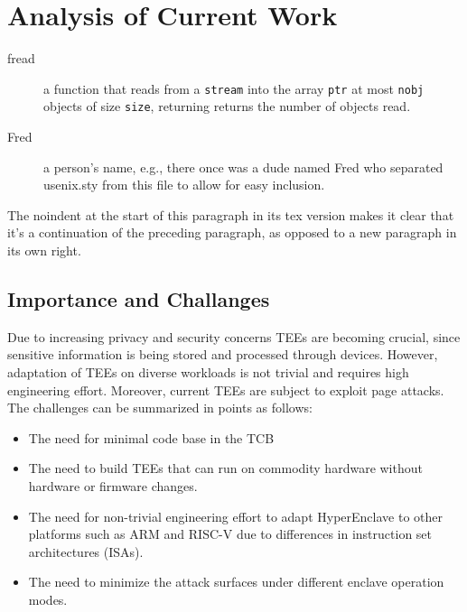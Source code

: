 \section{Analysis of Current Work}

\begin{description}
  
\item[fread] a function that reads from a \texttt{stream} into the
  array \texttt{ptr} at most \texttt{nobj} objects of size
  \texttt{size}, returning returns the number of objects read.

\item[Fred] a person's name, e.g., there once was a dude named Fred
  who separated usenix.sty from this file to allow for easy
  inclusion.
\end{description}

\noindent
The noindent at the start of this paragraph in its tex version makes
it clear that it's a continuation of the preceding paragraph, as
opposed to a new paragraph in its own right.



\subsection{Importance and Challanges}
Due to increasing privacy and security concerns TEEs are becoming crucial, since sensitive information is being stored and processed through devices. However, adaptation of TEEs on diverse workloads is not trivial and requires high engineering effort. Moreover, current TEEs are subject to exploit page attacks. The challenges can be summarized in points as follows: 
\begin{itemize}
    \item The need for minimal code base in the TCB
    \item The need to build TEEs that can run on commodity hardware without hardware or firmware changes.
    \item The need for non-trivial engineering effort to adapt HyperEnclave to other platforms such as ARM and RISC-V due to differences in instruction set architectures (ISAs).
    \item The need to minimize the attack surfaces under different enclave operation modes.
\end{itemize}




